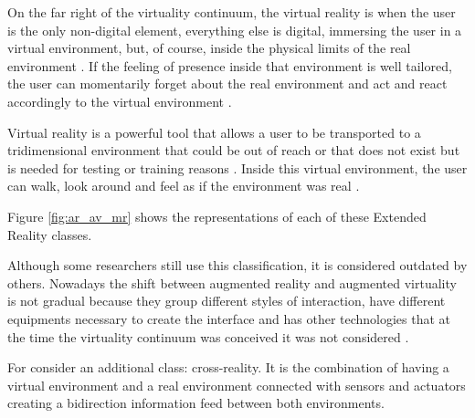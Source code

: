 On the far right of the virtuality continuum, the virtual reality is when the user is the only non-digital element, everything else is digital, immersing the user in a virtual environment, but, of course, inside the physical limits of the real environment \cite{ma2007virtuality}. If the feeling of presence inside that environment is well tailored, the user can momentarily forget about the real environment and act and react accordingly to the virtual environment \cite{farrell2018learning}. 
    
Virtual reality is a powerful tool that allows a user to be transported to a tridimensional environment that could be out of reach or that does not exist but is needed for testing or training reasons \cite{mujber2004virtual}. Inside this virtual environment, the user can walk, look around and feel as if the environment was real \cite{salah2019virtual}.

Figure \ref{fig:ar_av_mr} shows the representations of each of these Extended Reality classes.



Although some researchers still use this classification, it is considered outdated by others. Nowadays the shift between augmented reality and augmented virtuality is not gradual because they group different styles of interaction, have different equipments necessary to create the interface and has other technologies that at the time the virtuality continuum was conceived it was not considered \cite{cerqueira2019tangible}.

For  consider an additional class: cross-reality. It is the combination of having a virtual environment and a real environment connected with sensors and actuators creating a bidirection information feed between both environments.